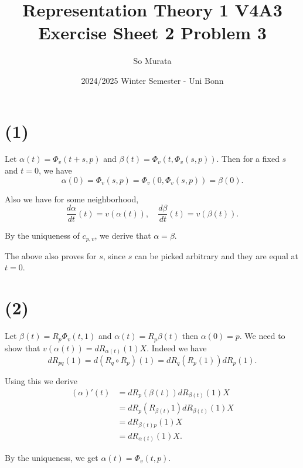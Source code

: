 \documentclass{article}
\title{Representation Theory 1 V4A3 Exercise Sheet 2 Problem 3}
\author{So Murata}
\date{2024/2025 Winter Semester - Uni Bonn}
\numberwithin{equation}{section}
\begin{document}
\maketitle

\section*{(1)}

Let $\alpha(t)=\Phi_v(t+s,p)$ and $\beta(t) = \Phi_v(t,\Phi_v(s,p))$. Then for a fixed $s$ and $t=0$, we have
\begin{equation*}
\alpha(0) = \Phi_v(s,p) = \Phi_v(0,\Phi_v(s,p))=\beta(0).
\end{equation*}

Also we have for some neighborhood, 
\begin{equation*}
{\frac {d\alpha} {dt}}(t) = v(\alpha(t)), \quad {\frac {d\beta} {dt}}(t) = v(\beta(t)).
\end{equation*}

By the uniqueness of $c_{p,v}$, we derive that $\alpha=\beta$.\\
\par The above also proves for $s$, since $s$ can be picked arbitrary and they are equal at $t=0$.

\section*{(2)}

Let $\beta(t) = R_p\Phi_v(t,1)$ and $\alpha(t) = R_p\beta(t)$ then $\alpha(0)=p$. We need to show that $v(\alpha(t)) = dR_{\alpha(t)}(1)X$. Indeed we have
\begin{equation*}
dR_{pq}(1) = d(R_q\circ R_p)(1) = dR_q(R_p(1))dR_p(1).
\end{equation*}

Using this we derive
\begin{align*}
(\alpha)'(t) &= dR_p(\beta(t))dR_{\beta(t)}(1)X\\
& = dR_p(R_{\beta(t)}1)dR_{\beta(t)}(1)X\\
& = dR_{\beta(t)p}(1)X\\
&= dR_{\alpha(t)}(1)X.
\end{align*}

By the uniqueness, we get $\alpha(t) = \Phi_v(t,p)$.
\end{document}
